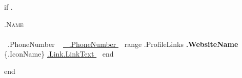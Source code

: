 {{if .}}
\begin{center}
    {\Huge \scshape {{.Name}} } \\ \vspace{4pt}
    \\ \vspace{4pt}
    \small \raisebox{-0.1\height}\faPhone\ {{.PhoneNumber}} ~ \href{ {{.Email}} }{\raisebox{-0.2\height}\faEnvelope\  \underline{ {{.PhoneNumber}} } } ~
    {{range .ProfileLinks}} 
    \textbf{ {{.WebsiteName}} } {\raisebox{-0.2\height}\{{.IconName}}\} \href{ {{.Link.LinkURL}} } {\underline{ {{.Link.LinkText}} } }  ~
    {{end}}
    \vspace{-8pt}
\end{center}
{{end}}